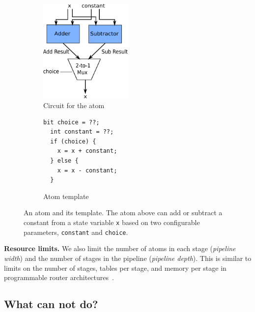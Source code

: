 \begin{figure}[h]
  \begin{subfigure}{0.5\columnwidth}
  \centering
  \includegraphics[width=0.5\textwidth]{domino_circuit.pdf}
  \caption{Circuit for the atom}
  \label{fig:alu_diag}
  \end{subfigure}
  \hspace{0.1\columnwidth}
  \begin{subfigure}{0.3\columnwidth}
  \begin{lstlisting}[belowskip=-0.8 \baselineskip]
  bit choice = ??;
  int constant = ??;
  if (choice) {
    x = x + constant;
  } else {
    x = x - constant;
  }
  \end{lstlisting}
  \hspace{0.1\columnwidth}
  \caption{Atom template}
  \label{fig:alu_in_sketch}
  \end{subfigure}
  \caption{An atom and its template. The atom above can add or subtract a constant from a state
  variable {\tt x} based on two configurable parameters, {\tt constant} and {\tt choice}.}
  \label{fig:atom}
\end{figure}

\medskip
\noindent
\textbf{Resource limits.} We also limit the number of atoms in each stage
(\textit{pipeline width}) and the number of stages in the pipeline
(\textit{pipeline depth}). This is similar to limits on the number of stages,
tables per stage, and memory per stage in programmable router
architectures~\cite{lavanya_compiler}.

\subsection{What can \absmachine not do?}
\label{domino_ss:limitations}

